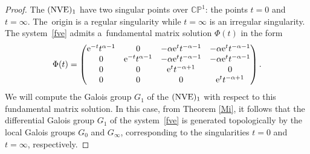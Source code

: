 \documentclass[10pt,a4paper]{article}
\numberwithin{equation}{section}
\begin{document}
 \begin{proof}

 The $({\rm NVE})_1$ have two singular points over $\mathbb{C}\mathbb{P}^1$: the points $t=0$ and $t=\infty$. The~origin is a regular singularity while $t=\infty$ is an irregular singularity.
 The system~\eqref{fve} admits a~fundamental matrix solution $\Phi(t)$ in the form
 \[
 \Phi(t)=\begin{pmatrix}
 {\rm e}^{-t} t^{\alpha-1} & 0 & -\alpha {\rm e}^t t^{-\alpha-1} & -\alpha {\rm e}^t t^{-\alpha-1}\\[0.1ex]
 0 & {\rm e}^{-t} t^{\alpha-1} & -\alpha {\rm e}^t t^{-\alpha-1} & -\alpha {\rm e}^t t^{-\alpha-1}\\[0.1ex]
 0 & 0 & {\rm e}^t t^{-\alpha+1} & 0\\[0.1ex]
 0 & 0 & 0 & {\rm e}^t t^{-\alpha+1}
 \end{pmatrix}.
 \]
 We will compute the Galois group $G_1$ of the $({\rm NVE})_1$ with respect to this fundamental matrix solution.
 In this case, from Theorem \ref{Mi}, it follows that
 the differential Galois group $G_1$ of the system~\eqref{fve} is generated topologically by the local Galois groups $G_0$ and $G_{\infty}$, corresponding to the singularities $t=0$ and $t=\infty$, respectively.


\end{proof}
\end{document}
